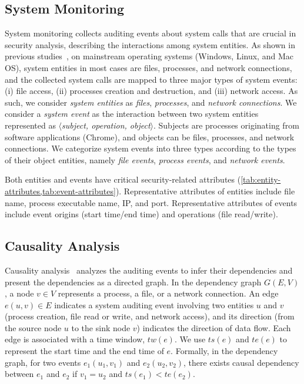 \subsection{System Monitoring}
\label{subsec:system-monitoring}

System monitoring collects auditing events about system calls that are crucial in security analysis, describing the interactions among system entities.
As shown in previous studies~\cite{backtracking,backtracking2,taser,wormlog,gao2018saql,gao2018aiql,mcitracking,logtracking,liu2018priotracker,hassan2019nodoze}, on mainstream operating systems (Windows, Linux, and Mac OS), system entities in most cases are files, processes, and network connections,
and the collected system calls are mapped to three major types of system events:
(i) file access, 
(ii) processes creation and destruction, and
(iii) network access.
As such, we consider \emph{system entities} as \emph{files}, \emph{processes}, and \emph{network connections}.
We consider a \emph{system event} as the interaction between two system entities represented as \emph{$\langle$subject, operation, object$\rangle$}. Subjects are processes originating from software applications (\eg Chrome), and objects can be files, processes, and network connections. 
We categorize system events into three types according to the types of their object entities, namely \emph{file events}, \emph{process events}, and \emph{network events}.


Both entities and events have critical security-related
attributes (\cref{tab:entity-attributes,tab:event-attributes}).
Representative attributes of entities include file name, process executable name, IP, and port.
Representative attributes of events include event origins (\eg start time/end time) and operations (\eg file read/write).

\subsection{Causality Analysis}
\label{subsec:causality-analysis}

Causality analysis~\cite{backtracking,backtracking2,taser,intrusionrecovery,liu2018priotracker} analyzes the auditing events to infer their dependencies 
and present the dependencies as a directed graph.
%
In the dependency graph $G(E,V)$, a node $v \in V$ represents a process, a file, or a network connection.
An edge $e(u, v) \in E$ indicates a system auditing event involving two entities $u$ and $v$ (\eg process creation, file read or write, and network access), and its direction (from the source node $u$ to the sink node $v$) indicates the direction of data flow.
Each edge is associated with a time window, $tw(e)$.
We use $ts(e)$ and $te(e)$ to represent the start time and the end time of $e$.
Formally, in the dependency graph, for two events $e_1(u_1, v_1) $ and $e_2(u_2, v_2)$, there exists causal dependency between $e_1$ and $e_2$ if $v_1 = u_2$ and $ts(e_1) < te(e_2)$.

